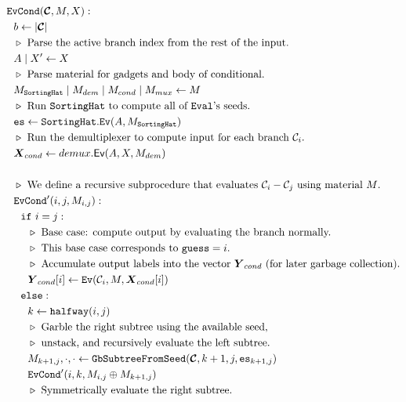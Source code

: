 \begin{figure}
  \begin{align*}
    &\evcond(\vec{\cir}, \mat, X):\\
    &~~b \gets | \vec{\cir} |\\
    &~~\codecomment{Parse the active branch index from the rest of the
    input.}\\
    &~~\aid \mid X' \gets X\\
    &~~\codecomment{Parse material for gadgets and body of conditional.}\\
    &~~\mat_\gadget \mid \mat_{dem} \mid \mat_{cond} \mid \mat_{mux} \gets \mat\\
    &~~\codecomment{Run $\gadget$ to compute all of \E's seeds.}\\
    &~~\es \gets \gadget.\mathtt{Ev}(\aid, \mat_\gadget)\\
    &~~\codecomment{Run the demultiplexer to compute input for each
    branch $\cir_i$.}\\
    &~~\vec{X}_{cond} \gets \evdem(\aid, X, \mat_{dem})\\
    \\
    &~~\codecomment{We define a recursive subprocedure that evaluates $\cir_i - \cir_j$ using material $\mat$.}\\
    &~~\evcond'(i, j, \mat_{i, j}):\\
    &~~~~\cif~i = j:\\
    &~~~~~~\codecomment{Base case: compute output by evaluating the branch normally.}\\
    &~~~~~~\codecomment{This base case corresponds to $\guess = i$.}\\
    &~~~~~~\codecomment{Accumulate output labels into the vector
    $\gcirout_{cond}$ (for later garbage collection).}\\
    &~~~~~~\gcirout_{cond}[i] \gets \ev(\cir_i, M, \gcirinp_{cond}[i])\\
    &~~~~\celse:\\
    &~~~~~~k \gets \halfway(i, j)\\
    &~~~~~~\codecomment{Garble the right subtree using the available
    seed,}\\
    &~~~~~~\codecomment{unstack, and recursively evaluate the left
    subtree.}\\
    &~~~~~~\mat_{k+1,j}, \cdot, \cdot \gets \gbtree(\vec{\cir}, k+1, j, \es_{k+1, j})\\
    &~~~~~~\evcond'(i, k, \mat_{i, j} \oplus \mat_{k+1,j})\\
    &~~~~~~\codecomment{Symmetrically evaluate the right subtree.}\\

\end{align*}
\end{figure}
